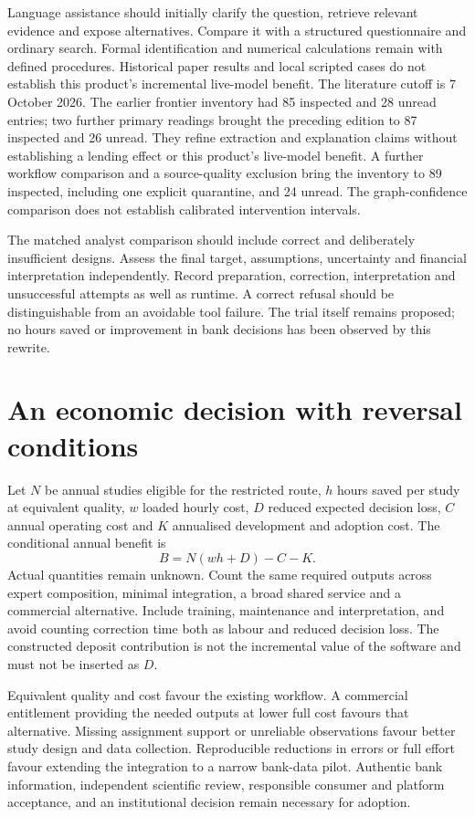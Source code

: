 Language assistance should initially clarify the question, retrieve relevant
evidence and expose alternatives. Compare it with a structured questionnaire
and ordinary search. Formal identification and numerical calculations remain
with defined procedures. Historical paper results and local scripted cases
do not establish this product's incremental live-model benefit. The
literature cutoff is 7 October 2026. The earlier frontier inventory had
85 inspected and 28 unread entries; two further primary readings brought the
preceding edition to 87 inspected and 26 unread. They refine extraction and
explanation claims without establishing a lending effect or this product's
live-model benefit. A further workflow comparison and a source-quality
exclusion bring the inventory to 89 inspected, including one explicit
quarantine, and 24 unread. The graph-confidence comparison does not establish
calibrated intervention intervals.

The matched analyst comparison should include correct and deliberately
insufficient designs. Assess the final target, assumptions, uncertainty and
financial interpretation independently. Record preparation, correction,
interpretation and unsuccessful attempts as well as runtime. A correct
refusal should be distinguishable from an avoidable tool failure. The trial
itself remains proposed; no hours saved or improvement in bank decisions
has been observed by this rewrite.

\section*{An economic decision with reversal conditions}
Let $N$ be annual studies eligible for the restricted route, $h$ hours saved
per study at equivalent quality, $w$ loaded hourly cost, $D$ reduced expected
decision loss, $C$ annual operating cost and $K$ annualised development and
adoption cost. The conditional annual benefit is
\[ B=N(wh+D)-C-K. \]
Actual quantities remain unknown. Count the same required outputs across
expert composition, minimal integration, a broad shared service and a
commercial alternative. Include training, maintenance and interpretation,
and avoid counting correction time both as labour and reduced decision loss.
The constructed deposit contribution is not the incremental value of the
software and must not be inserted as $D$.

Equivalent quality and cost favour the existing workflow. A commercial
entitlement providing the needed outputs at lower full cost favours that
alternative. Missing assignment support or unreliable observations favour
better study design and data collection. Reproducible reductions in errors
or full effort favour extending the integration to a narrow bank-data
pilot. Authentic bank information, independent scientific review, responsible
consumer and platform acceptance, and an institutional decision remain
necessary for adoption.

